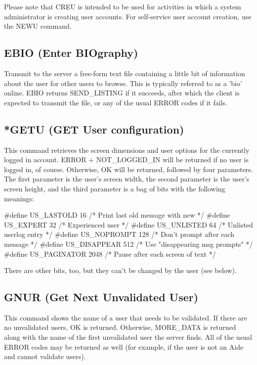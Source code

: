  Please note that CREU is intended to be used for activities in which a
system administrator is creating user accounts.  For self-service user
account creation, use the NEWU command.



\subsection{EBIO (Enter BIOgraphy)}

 Transmit to the server a free-form text file containing a little bit of
information about the user for other users to browse.  This is typically
referred to as a 'bio' online.  EBIO returns SEND_LISTING if it succeeds,
after which the client is expected to transmit the file, or any of the usual
ERROR codes if it fails.



\subsection{*GETU (GET User configuration)}

 This command retrieves the screen dimensions and user options for the
currently logged in account.  ERROR + NOT_LOGGED_IN will be returned if no
user is logged in, of course.  Otherwise, OK will be returned, followed by
four parameters.  The first parameter is the user's screen width, the second
parameter is the user's screen height, and the third parameter is a bag of
bits with the following meanings:

 \#define US_LASTOLD	16		/* Print last old message with new  */
 \#define US_EXPERT	32		/* Experienced user		    */
 \#define US_UNLISTED	64		/* Unlisted userlog entry           */
 \#define US_NOPROMPT	128		/* Don't prompt after each message  */
 \#define US_DISAPPEAR	512		/* Use "disappearing msg prompts"   */
 \#define US_PAGINATOR	2048		/* Pause after each screen of text  */

 There are other bits, too, but they can't be changed by the user (see below).



\subsection{GNUR (Get Next Unvalidated User)}

 This command shows the name of a user that needs to be validated.  If there
are no unvalidated users, OK is returned.  Otherwise, MORE_DATA is returned
along with the name of the first unvalidated user the server finds.  All of
the usual ERROR codes may be returned as well (for example, if the user is
not an Aide and cannot validate users).

